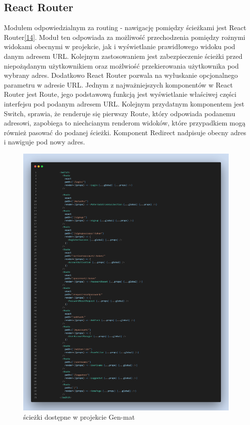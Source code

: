 \documentclass[oneside,polski,logo,indent]{amuthesis}
\begin{document}
\begin{enumerate}
\begin{enumerate}
\section{React Router}
Modułem odpowiedzialnym za routing - nawigację pomiędzy ścieżkami jest React Router\hyperlink{[14]}{[14]}. Moduł ten odpowiada za
możliwość przechodzenia pomiędzy rożnymi widokami obecnymi w projekcie, jak i wyświetlanie prawidłowego widoku pod danym adresem URL.
Kolejnym zastosowaniem jest zabezpieczenie ścieżki przed niepożądanym użytkownikiem oraz możlwiość przekierowania użytkownika pod wybrany adres.
Dodatkowo React Router pozwala na wyłuskanie opcjonalnego parametru w adresie URL.
\newline
\newline
Jednym z najważniejszych komponentów w React Router jest Route, jego podstawową funkcją jest wyświetlanie właściwej części interfejsu pod podanym adresem URL.
Kolejnym przydatnym komponentem jest Switch, sprawia, że renderuje się pierwszy Route, który odpowiada podanemu adresowi, zapobiega to niechcianym renderom widoków, które przypadkiem mogą również pasować do podanej ścieżki. Komponent Redirect nadpisuje obecny adres i nawiguje pod nowy adres.

\begin{figure}[H]
\centering
\includegraphics[width=13cm]{route switch.png}
\caption{ścieżki dostępne w projekcie Gen-mat
}


\end{figure}
\end{enumerate}
\end{enumerate}
\end{document}
